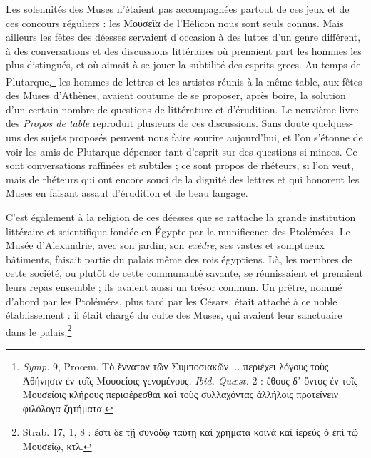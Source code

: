 \documentclass[landscape, a4paper, 11pt, oneside, polutonikogreek, french]{article}
\begin{document}
Les solennités des Muses n'étaient pas accompagnées partout de ces jeux et de ces concours réguliers : les Μουσεῖα de l'Hélicon nous sont seuls connus. Mais ailleurs les fêtes des déesses servaient d'occasion à des luttes d'un genre différent, à des conversations et des discussions littéraires où prenaient part les hommes les plus distingués, et où aimait à se jouer la subtilité des esprits grecs. Au temps de Plutarque,\footnote{\emph{Symp.} 9, Proœm. Τὸ ἔννατον τῶν Συμποσιακῶν ... περιέχει λόγους τοὺς Ἀθήνησιν ἐν τοῖς Μουσείοις γενομένους. \emph{Ibid. Quæst.} 2 : ἔθους δ᾽ ὄντος ἐν τοῖς Μουσείοις κλήρους περιφέρεσθαι καὶ τοὺς συλλαχόντας ἀλλήλοις προτείνειν φιλόλογα ζητήματα.} les hommes de lettres et les artistes réunis à la même table, aux fêtes des Muses d'Athènes, avaient coutume de se proposer, après boire, la solution d'un certain nombre de questions de littérature et d'érudition. Le neuvième livre des \emph{Propos de table} reproduit plusieurs de ces discussions. Sans doute quelques-uns des sujets proposés peuvent nous faire sourire aujourd'hui, et l'on s'étonne de voir les amis de Plutarque dépenser tant d'esprit sur des questions si minces. Ce sont conversations raffinées et subtiles ; ce sont propos de rhéteurs, si l'on veut, mais de rhéteurs qui ont encore souci de la dignité des lettres et qui honorent les Muses en faisant assaut d'érudition et de beau langage.

C'est également à la religion de ces déesses que se rattache la grande institution littéraire et scientifique fondée en Égypte par la munificence des Ptolémées. Le Musée d'Alexandrie, avec son jardin, son \emph{exèdre}, ses vastes et somptueux bâtiments, faisait partie du palais même des rois égyptiens. Là, les membres de cette société, ou plutôt de cette communauté savante, se réunissaient et prenaient leurs repas ensemble ; ils avaient aussi un trésor commun. Un prêtre, nommé d'abord par les Ptolémées, plus tard par les Césars, était attaché à ce noble établissement : il était chargé du culte des Muses, qui avaient leur sanctuaire dans le palais.\footnote{Strab. 17, 1, 8 : ἔστι δὲ τῇ συνόδῳ ταύτῃ καὶ χρήματα κοινὰ καὶ ἱερεὺς ὁ ἐπὶ τῷ Μουσείῳ, κτλ.}
\end{document}
